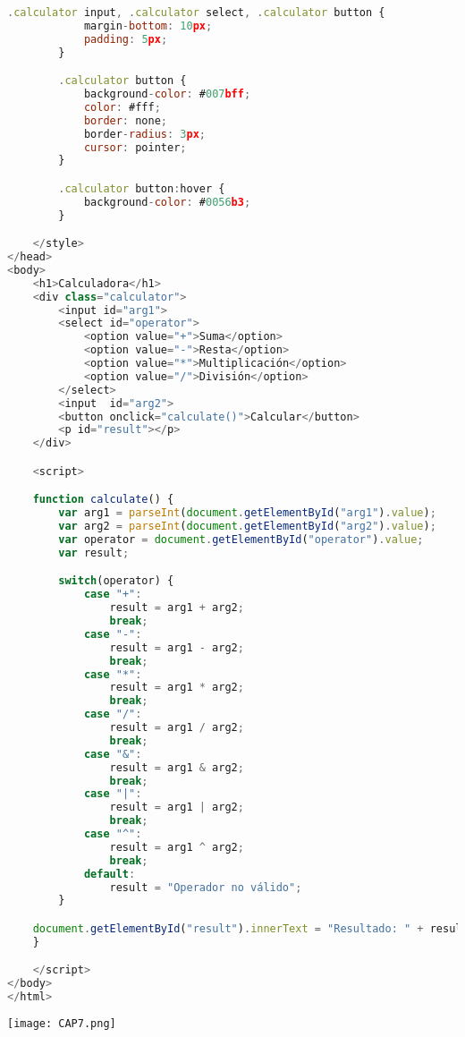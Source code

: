 \documentclass{article}
\begin{document}
\begin{itemize}
\begin{lstlisting}[language=JavaScript, caption=EJERCICIO\_06B.js]
        .calculator input, .calculator select, .calculator button {
            margin-bottom: 10px;
            padding: 5px;
        }

        .calculator button {
            background-color: #007bff;
            color: #fff;
            border: none;
            border-radius: 3px;
            cursor: pointer;
        }

        .calculator button:hover {
            background-color: #0056b3;
        }

    </style>
</head>
<body>
    <h1>Calculadora</h1>
    <div class="calculator">
        <input id="arg1">
        <select id="operator">
            <option value="+">Suma</option>
            <option value="-">Resta</option>
            <option value="*">Multiplicación</option>
            <option value="/">División</option>
        </select>
        <input  id="arg2">
        <button onclick="calculate()">Calcular</button>
        <p id="result"></p>
    </div>

    <script>

    function calculate() {
        var arg1 = parseInt(document.getElementById("arg1").value);
        var arg2 = parseInt(document.getElementById("arg2").value);
        var operator = document.getElementById("operator").value;
        var result;

        switch(operator) {
            case "+":
                result = arg1 + arg2;
                break;
            case "-":
                result = arg1 - arg2;
                break;
            case "*":
                result = arg1 * arg2;
                break;
            case "/":
                result = arg1 / arg2;
                break;
            case "&":
                result = arg1 & arg2;
                break;
            case "|":
                result = arg1 | arg2;
                break;
            case "^":
                result = arg1 ^ arg2;
                break;
            default:
                result = "Operador no válido";
        }

    document.getElementById("result").innerText = "Resultado: " + result;
    }

    </script>
</body>
</html>
            \end{lstlisting}
            \newline \newline \newline
            \texttt{[image: CAP7.png]}


\end{itemize}
\end{document}
